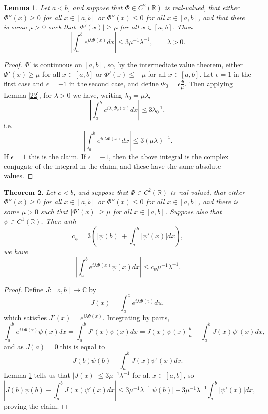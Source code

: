 \documentclass{article}
\newtheorem{theorem}{Theorem}
\newtheorem{lemma}[theorem]{Lemma}
\theoremstyle{definition}
\begin{document}
\begin{lemma}
Let $a<b$,
 and suppose that $\Phi \in C^2(\mathbb{R})$ is real-valued,  that either $\Phi''(x) \geq 0$ for all $x \in [a,b]$ or $\Phi''(x) \leq 0$ for all $x \in [a,b]$,
 and that  there is some $\mu > 0$ such that $|\Phi'(x)| \geq \mu$ for  all $x \in [a,b]$. 
 Then 
 \[
\left| \int_a^b e^{i\lambda \Phi(x)} dx\right|  \leq 3 \mu^{-1} \lambda^{-1}, \qquad \lambda >0.
 \]
 \label{muinequality}
\end{lemma}
\begin{proof}
$\Phi'$ is continuous on  $[a,b]$, so, by the intermediate value theorem, either
$\Phi'(x) \geq \mu$ for all $x \in [a,b]$ or $\Phi'(x) \leq -\mu$ for all $x \in [a,b]$. Let $\epsilon=1$ in the first
case and $\epsilon=-1$ in the second case, and define $\Phi_0=\epsilon \frac{\Phi}{\mu}$.
Then applying Lemma \ref{22}, for $\lambda>0$ we have, writing $\lambda_0=\mu \lambda$,
\[
\left| \int_a^b e^{i \lambda_0 \Phi_0(x)} dx \right| \leq 3\lambda_0^{-1},
\]
i.e.
\[
\left| \int_a^b e^{i \epsilon \lambda \Phi(x)} dx \right| \leq 3(\mu \lambda)^{-1}.
\]
If $\epsilon=1$ this is the claim. If $\epsilon=-1$, then the above integral is the complex conjugate of the integral in the claim, and these have the same
absolute values.
\end{proof}


\begin{theorem}
Let $a<b$,
 and suppose that $\Phi \in C^2(\mathbb{R})$ is real-valued, that either $\Phi''(x) \geq 0$ for all $x \in [a,b]$ or $\Phi''(x) \leq 0$ for all $x \in [a,b]$,
 and  there is some $\mu > 0$ such that $|\Phi'(x)| \geq \mu$ for  all $x \in [a,b]$.  Suppose also
 that $\psi \in C^1(\mathbb{R})$.
 Then with
 \[
 c_\psi = 3\left( |\psi(b)| + \int_a^b |\psi'(x)| dx \right),
 \]
 we have
 \[
 \left| \int_a^b e^{i\lambda \Phi(x)} \psi(x) dx \right| \leq c_\psi \mu^{-1} \lambda^{-1}.
 \]
 \label{lambdaamplitude}
\end{theorem}
\begin{proof}
Define $J:[a,b] \to \mathbb{C}$ by
\[
J(x) = \int_a^x e^{i\lambda \Phi(u)} du,
\]
which satisfies $J'(x)=e^{i\lambda \Phi(x)}$. Integrating by parts, 
\[
\int_a^b e^{i\lambda \Phi(x)} \psi(x) dx = \int_a^b J'(x) \psi(x) dx =
J(x)\psi(x) \bigg|_a^b -\int_a^b J(x) \psi'(x) dx,
\]
and as $J(a)=0$ this is equal to
\[
J(b)\psi(b)-\int_a^b J(x) \psi'(x) dx.
\]
Lemma \ref{muinequality} tells us that $|J(x)| \leq 3\mu^{-1} \lambda^{-1}$ for all $x \in [a,b]$, so
\[
\left|J(b)\psi(b)-\int_a^b J(x) \psi'(x) dx\right| \leq 3\mu^{-1} \lambda^{-1} |\psi(b)|
+ 3\mu^{-1} \lambda^{-1} \int_a^b |\psi'(x)| dx,
\]
proving the claim.
\end{proof}
\end{document}
